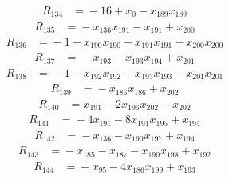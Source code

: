 \begin{align*}
R_{134}&={}-16 +x_{0} -x_{189}x_{189}
\end{align*}
\begin{align*}
R_{135}&={}-x_{136}x_{191} -x_{191} +x_{200}
\end{align*}
\begin{align*}
R_{136}&={}-1 +x_{190}x_{190} +x_{191}x_{191} -x_{200}x_{200}
\end{align*}
\begin{align*}
R_{137}&={}-x_{193} -x_{193}x_{194} +x_{201}
\end{align*}
\begin{align*}
R_{138}&={}-1 +x_{192}x_{192} +x_{193}x_{193} -x_{201}x_{201}
\end{align*}
\begin{align*}
R_{139}&={}-x_{186}x_{186} +x_{202}
\end{align*}
\begin{align*}
R_{140}&={}x_{191} -2x_{196}x_{202} -x_{202}
\end{align*}
\begin{align*}
R_{141}&={}-4x_{191} -8x_{191}x_{195} +x_{194}
\end{align*}
\begin{align*}
R_{142}&={}-x_{136} -x_{190}x_{197} +x_{194}
\end{align*}
\begin{align*}
R_{143}&={}-x_{185} -x_{187} -x_{190}x_{198} +x_{192}
\end{align*}
\begin{align*}
R_{144}&={}-x_{95} -4x_{186}x_{199} +x_{193}
\end{align*}
